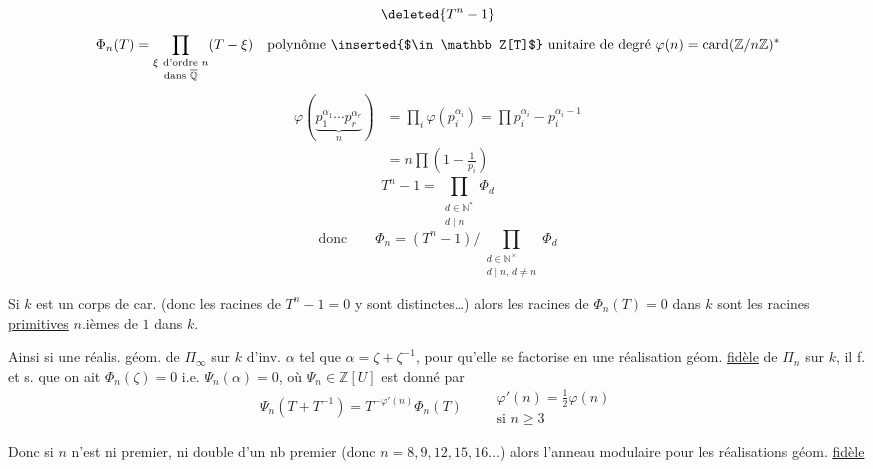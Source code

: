 
\[
\deleted{T^n-1}
\]
\[
\Phi_n(T)=\prod_{\substack{\xi\ \text{d'ordre }n\\ \text{dans }\overline{\mathbb Q}}}(T-\xi)
\quad\text{polynôme \inserted{$\in\mathbb Z[T]$} unitaire de degré }\varphi(n)=\operatorname{card}(\mathbb Z/n\mathbb Z)^*
\]
\[
\begin{aligned}
\varphi(\underbrace{p_1^{\alpha_1}\cdots p_r^{\alpha_r}}_{n})
 &=\prod_i\varphi(p_i^{\alpha_i})=\prod p_i^{\alpha_i}-p_i^{\alpha_i-1}\\
 &=n\prod\left(1-\frac1{p_i}\right)
\end{aligned}
\]
\[
T^n-1=\prod_{\substack{d\in\mathbb N^*\\ d\mid n}}\Phi_d
\]
\[
\text{donc}\qquad
\Phi_n=(T^n-1)\big/\prod_{\substack{d\in\mathbb N^{\times}\\ d\mid n,\,d\ne n}}\Phi_d
\]

Si $k$ est un corps de car.  (donc les racines de
$T^n-1=0$ y sont distinctes\ldots) alors les racines de
$\Phi_n(T)=0$ dans $k$ sont les racines \uline{primitives} $n$.ièmes
de $1$ dans $k$.

Ainsi si   une réalis. 
géom.  de $\Pi_\infty$ sur $k$
d'inv. $\alpha$ tel que $\alpha=\zeta+\zeta^{-1}$,
pour qu'elle se factorise en une réalisation géom.
\uline{fidèle} de $\Pi_n$ sur $k$,  il f. et s. que on ait
$\Phi_n(\zeta)=0$ i.e. $\Psi_n(\alpha)=0$, où $\Psi_n\in\mathbb Z[U]$ est
donné par
\[
\Psi_n(T+T^{-1})=T^{-\varphi'(n)}\Phi_n(T)
\qquad\substack{\varphi'(n)=\tfrac12\varphi(n)\\ \text{si }n\geq 3}
\]

Donc si $n$  n'est ni premier, ni double d'un 
nb premier (donc $n=8,9,12,15,16\ldots$) alors l'anneau
modulaire pour les réalisations géom. \uline{fidèle}
\par\noindent{}
